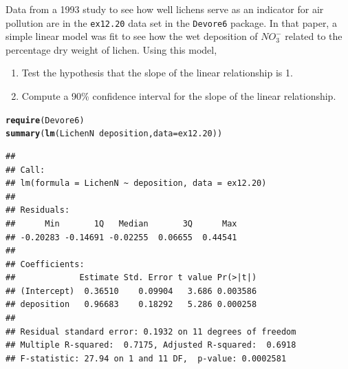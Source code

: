 \documentclass[twoside]{book}\usepackage[]{graphicx}\usepackage[]{xcolor}
\makeatletter
\newcommand{\hlopt}[1]{\textcolor[rgb]{0,0,0}{#1}}%
\newcommand{\hlstd}[1]{\textcolor[rgb]{0.345,0.345,0.345}{#1}}%
\newcommand{\hlkwc}[1]{\textcolor[rgb]{0.333,0.667,0.333}{#1}}%
\newcommand{\hlkwd}[1]{\textcolor[rgb]{0.737,0.353,0.396}{\textbf{#1}}}%
\newenvironment{kframe}{%
 \def\at@end@of@kframe{}%
 \ifinner\ifhmode%
  \def\at@end@of@kframe{\end{minipage}}%
  \begin{minipage}{\columnwidth}%
 \fi\fi%
 \def\FrameCommand##1{\hskip\@totalleftmargin \hskip-\fboxsep
 \colorbox{shadecolor}{##1}\hskip-\fboxsep
     \hskip-\linewidth \hskip-\@totalleftmargin \hskip\columnwidth}%
 \MakeFramed {\advance\hsize-\width
   \@totalleftmargin\z@ \linewidth\hsize
   \@setminipage}}%
 {\par\unskip\endMakeFramed%
 \at@end@of@kframe}
\newenvironment{knitrout}{}{} %
\newcommand{\Rindex}[1]{\index{\texttt{#1}}}
\newcommand{\dataframe}[1]{{\color{blue!80!black}\texttt{#1}}\Rindex{#1}}
\newcommand{\pkg}[1]{{\color{red!80!black}\texttt{#1}}\Rindex{#1}}
\makeatother
\begin{document}
\begin{problem}
	Data from a 1993 study to see how well lichens serve as an indicator for air pollution are in the 
	\dataframe{ex12.20} data set in the \pkg{Devore6} package. 
	In that paper, a simple linear model was fit to see how the wet deposition of $NO^{-}_3$ 
	related to the percentage dry weight of lichen.
	Using this model, 
	\begin{enumerate}
		\item
			Test the hypothesis that the slope of the linear relationship is 1.
		\item
			Compute a 90\% confidence interval for the slope of the linear relationship.
	\end{enumerate}
\begin{knitrout}
\color{fgcolor}\begin{kframe}
\begin{alltt}
\hlkwd{require}\hlstd{(Devore6)}
\hlkwd{summary}\hlstd{(}\hlkwd{lm}\hlstd{(LichenN} \hlopt{~} \hlstd{deposition,} \hlkwc{data} \hlstd{= ex12.20))}
\end{alltt}
\begin{verbatim}
## 
## Call:
## lm(formula = LichenN ~ deposition, data = ex12.20)
## 
## Residuals:
##      Min       1Q   Median       3Q      Max 
## -0.20283 -0.14691 -0.02255  0.06655  0.44541 
## 
## Coefficients:
##             Estimate Std. Error t value Pr(>|t|)
## (Intercept)  0.36510    0.09904   3.686 0.003586
## deposition   0.96683    0.18292   5.286 0.000258
## 
## Residual standard error: 0.1932 on 11 degrees of freedom
## Multiple R-squared:  0.7175,	Adjusted R-squared:  0.6918 
## F-statistic: 27.94 on 1 and 11 DF,  p-value: 0.0002581
\end{verbatim}
\end{kframe}
\end{knitrout}
\end{problem}
\end{document}
